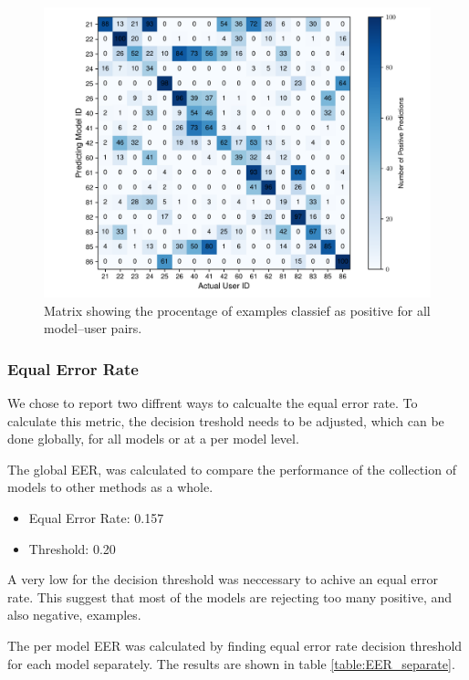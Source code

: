 \begin{figure}[H]
	\centering
	\includegraphics[width=\textwidth]{images/all_models_5_len40.pdf} %
	\caption{Matrix showing the procentage of examples classief as positive for all model--user pairs.}
	\label{fig:all_models_5_len40}
\end{figure}


\subsubsection{Equal Error Rate}
We chose to report two diffrent ways to calcualte the equal error rate. To calculate this metric, the decision treshold needs to be adjusted, which can be done globally, for all models or at a per model level. 

The global EER, was calculated to compare the performance of the collection of models to other methods as a whole.
\begin{itemize}
	\item[] Equal Error Rate: 0.157
	\item[] Threshold: 0.20
\end{itemize}
A very low for the decision threshold was neccessary to achive an equal error rate. This suggest that most of the models are rejecting too many positive, and also negative, examples.


The per model EER was calculated by finding equal error rate decision threshold for each model separately. The results are shown in table \ref{table:EER_separate}.

